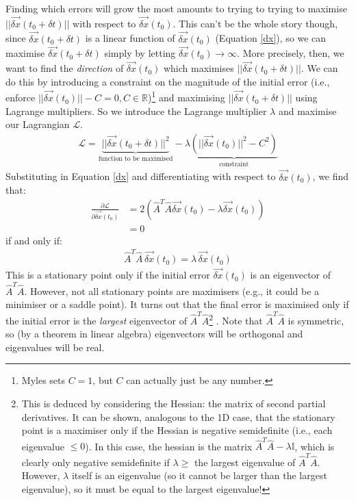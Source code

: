 Finding which errors will grow the most amounts to trying to trying to maximise $||\vec{\delta x}(t_0+\delta t)||$ with respect to $\vec{\delta x}(t_0)$. This can't be the whole story though, since $\vec{\delta x}(t_0+\delta t)$ is a linear function of $\vec{\delta x}(t_0)$ (Equation \ref{dx}), so we can maximise $\vec{\delta x}(t_0+\delta t)$ simply by letting $\vec{\delta x}(t_0)\to\infty$. More precisely, then, we want to find the \textit{direction} of $\vec{\delta x}(t_0)$ which maximises $||\vec{\delta x}(t_0+\delta t)||$. We can do this by introducing a constraint on the magnitude of the initial error (i.e., enforce $||\vec{\delta x}(t_0)||-C=0,C\in\mathbb{R}$)\footnote{Myles sets $C=1$, but $C$ can actually just be any number.} and maximising $||\vec{\delta x}(t_0+\delta t)||$ using Lagrange multipliers. So we introduce the Lagrange multiplier $\lambda$ and maximise our Lagrangian $\mathscr{L}$.
\begin{align}
    \mathscr{L}=\underbrace{||\vec{\delta x}(t_0+\delta t)||^2}_{\text{function to be maximised}}-\lambda\underbrace{(||\vec{\delta x}(t_0)||^2-C^2)}_\text{constraint}
\end{align}
Substituting in Equation \ref{dx} and differentiating with respect to $\vec{\delta x}(t_0)$, we find that:
\begin{align*}
    \frac{\partial\mathscr{L}}{\partial\vec{\delta x
    }(t_0)}&=2(\hat{A}^T\hat{A}\vec{\delta x}(t_0)-\lambda\vec{\delta x}(t_0))\\
    &=0
\end{align*}
if and only if:
\begin{align}
    \label{ATA Eigenequation}
    \boxed{\hat{A}^T\hat{A}\,\vec{\delta x}(t_0)=\lambda\,\vec{\delta x}(t_0)}
\end{align}
This is a stationary point only if the initial error $\vec{\delta x}(t_0)$ is an eigenvector of $\hat{A}^T\hat{A}$. However, not all stationary points are maximisers (e.g., it could be a minimiser or a saddle point). It turns out that the final error is maximised only if the initial error is the \textit{largest} eigenvector of $\hat{A}^T\hat{A}$\footnote{
    This is deduced by considering the Hessian: the matrix of second partial derivatives. It can be shown, analogous to the 1D case, that the stationary point is a maximiser only if the Hessian is negative semidefinite (i.e., each eigenvalue $\leq0$). In this case, the hessian is the matrix $\hat{A}^T\hat{A}-\lambda\mathbb{I}$, which is clearly only negative semidefinite if $\lambda\geq$ the largest eigenvalue of $\hat{A}^T\hat{A}$. However, $\lambda$ itself is an eigenvalue (so it cannot be larger than the largest eigenvalue), so it must be equal to the largest eigenvalue!}
. Note that $\hat{A}^T\hat{A}$ is symmetric, so (by a theorem in linear algebra) eigenvectors will be orthogonal and eigenvalues will be real.

